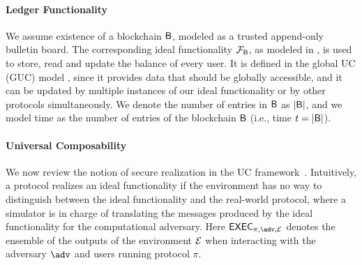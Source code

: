 \paragraph{Ledger Functionality}
We assume existence of a blockchain $\mathsf{B}$, modeled as a trusted append-only bulletin board. 
The corresponding ideal functionality $\mathcal{F}_{\mathsf{B}}$, as modeled in \cite{perun}, is used to 
store, read and update the  balance of every user.  It is defined in the 
global UC (GUC) model \cite{guc}, since it provides data that should be globally accessible, 
and it can be updated by multiple instances of our ideal functionality or by other protocols 
simultaneously. We denote the number of entries in $\mathsf{B}$ as $|\mathsf{B}|$, and we model time as the 
number of entries of the blockchain $\mathsf{B}$ (i.e., time $t = |\mathsf{B}|$).


 


\paragraph{Universal Composability}
We now review the notion of secure realization in the UC framework~\cite{canetti}. 
Intuitively, a protocol realizes an ideal functionality if the environment has no way 
to distinguish between the ideal functionality and the real-world protocol, where 
a simulator is in charge of translating the messages produced by the ideal functionality 
for the computational adversary. Here $\exec_{\pi, \adv, \dist}$ denotes the ensemble of 
the outputs of the environment $\mathcal{E}$ when interacting with the adversary $\adv$ and 
users running protocol $\pi$.

